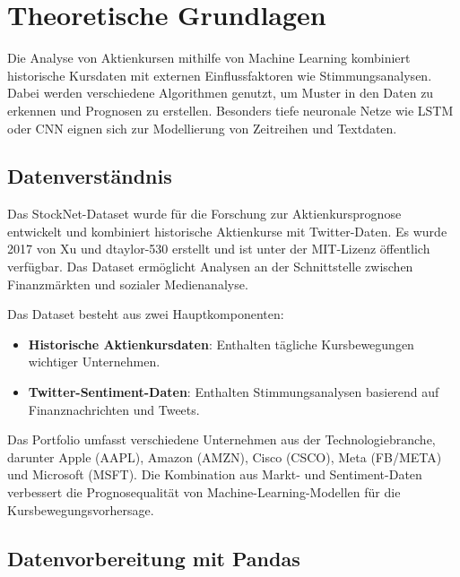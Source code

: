 
\newpage
\section{Theoretische Grundlagen}\label{sec:theorie}

Die Analyse von Aktienkursen mithilfe von Machine Learning kombiniert historische Kursdaten mit externen Einflussfaktoren wie Stimmungsanalysen. Dabei werden verschiedene Algorithmen genutzt, um Muster in den Daten zu erkennen und Prognosen zu erstellen. Besonders tiefe neuronale Netze wie LSTM oder CNN eignen sich zur Modellierung von Zeitreihen und Textdaten.

\autocite{goodfellow2016deep}
\autocite{hochreiter1997long}

\subsection{Datenverständnis}\label{sec:theorie_data_understanding}

Das StockNet-Dataset wurde für die Forschung zur Aktienkursprognose entwickelt und kombiniert historische Aktienkurse mit Twitter-Daten. Es wurde 2017 von Xu und dtaylor-530 erstellt und ist unter der MIT-Lizenz öffentlich verfügbar. Das Dataset ermöglicht Analysen an der Schnittstelle zwischen Finanzmärkten und sozialer Medienanalyse.

Das Dataset besteht aus zwei Hauptkomponenten:
\begin{itemize}
	\item \textbf{Historische Aktienkursdaten}: Enthalten tägliche Kursbewegungen wichtiger Unternehmen.
	\item \textbf{Twitter-Sentiment-Daten}: Enthalten Stimmungsanalysen basierend auf Finanznachrichten und Tweets.
\end{itemize}

Das Portfolio umfasst verschiedene Unternehmen aus der Technologiebranche, darunter Apple (AAPL), Amazon (AMZN), Cisco (CSCO), Meta (FB/META) und Microsoft (MSFT). Die Kombination aus Markt- und Sentiment-Daten verbessert die Prognosequalität von Machine-Learning-Modellen für die Kursbewegungsvorhersage.

\autocite{xu2018StockMovement}
\autocite{chen2018StockNet}

\subsection{Datenvorbereitung mit Pandas}\label{sec:datenvorbereitung}

